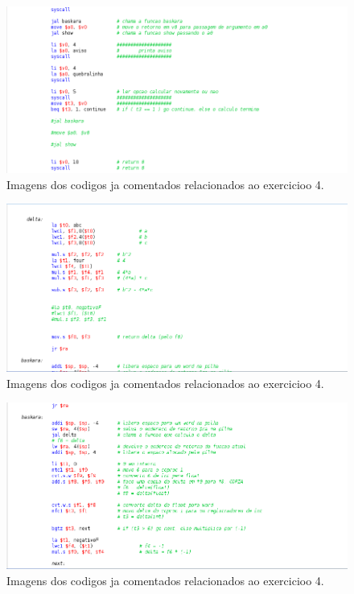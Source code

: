 \documentclass[12pt]{article}
\begin{document}
\begin{figure}[H]
	\centering
	\includegraphics[width=1\textwidth]{EX_4_3.png}
	\caption{Imagens dos codigos ja comentados relacionados ao exercicioo 4.}
	\label{fig:hilo}
\end{figure}

\begin{figure}[H]
	\centering
	\includegraphics[width=1\textwidth]{EX_4_4.png}
	\caption{Imagens dos codigos ja comentados relacionados ao exercicioo 4.}
	\label{fig:hilo}
\end{figure}

\begin{figure}[H]
	\centering
	\includegraphics[width=1\textwidth]{EX_4_5.png}
	\caption{Imagens dos codigos ja comentados relacionados ao exercicioo 4.}
	\label{fig:hilo}
\end{figure}
\end{document}

